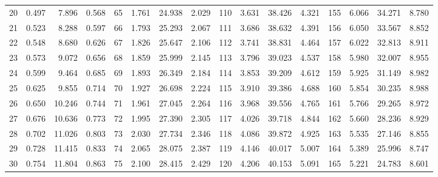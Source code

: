 \begin{table}
{\begin{tabular}{rrrr|rrrr|rrrr|rrrr}
 20 & \tiny{  0.497} &   7.896 & \tiny{  0.568} &  65 & \tiny{  1.761} &  24.938 & \tiny{  2.029} & 110 & \tiny{  3.631} &  38.426 & \tiny{  4.321} & 155 & \tiny{  6.066} &  34.271 & \tiny{  8.780}\\
 21 & \tiny{  0.523} &   8.288 & \tiny{  0.597} &  66 & \tiny{  1.793} &  25.293 & \tiny{  2.067} & 111 & \tiny{  3.686} &  38.632 & \tiny{  4.391} & 156 & \tiny{  6.050} &  33.567 & \tiny{  8.852}\\
 22 & \tiny{  0.548} &   8.680 & \tiny{  0.626} &  67 & \tiny{  1.826} &  25.647 & \tiny{  2.106} & 112 & \tiny{  3.741} &  38.831 & \tiny{  4.464} & 157 & \tiny{  6.022} &  32.813 & \tiny{  8.911}\\
 23 & \tiny{  0.573} &   9.072 & \tiny{  0.656} &  68 & \tiny{  1.859} &  25.999 & \tiny{  2.145} & 113 & \tiny{  3.796} &  39.023 & \tiny{  4.537} & 158 & \tiny{  5.980} &  32.007 & \tiny{  8.955}\\
 24 & \tiny{  0.599} &   9.464 & \tiny{  0.685} &  69 & \tiny{  1.893} &  26.349 & \tiny{  2.184} & 114 & \tiny{  3.853} &  39.209 & \tiny{  4.612} & 159 & \tiny{  5.925} &  31.149 & \tiny{  8.982}\\
 25 & \tiny{  0.625} &   9.855 & \tiny{  0.714} &  70 & \tiny{  1.927} &  26.698 & \tiny{  2.224} & 115 & \tiny{  3.910} &  39.386 & \tiny{  4.688} & 160 & \tiny{  5.854} &  30.235 & \tiny{  8.988}\\
 26 & \tiny{  0.650} &  10.246 & \tiny{  0.744} &  71 & \tiny{  1.961} &  27.045 & \tiny{  2.264} & 116 & \tiny{  3.968} &  39.556 & \tiny{  4.765} & 161 & \tiny{  5.766} &  29.265 & \tiny{  8.972}\\
 27 & \tiny{  0.676} &  10.636 & \tiny{  0.773} &  72 & \tiny{  1.995} &  27.390 & \tiny{  2.305} & 117 & \tiny{  4.026} &  39.718 & \tiny{  4.844} & 162 & \tiny{  5.660} &  28.236 & \tiny{  8.929}\\
 28 & \tiny{  0.702} &  11.026 & \tiny{  0.803} &  73 & \tiny{  2.030} &  27.734 & \tiny{  2.346} & 118 & \tiny{  4.086} &  39.872 & \tiny{  4.925} & 163 & \tiny{  5.535} &  27.146 & \tiny{  8.855}\\
 29 & \tiny{  0.728} &  11.415 & \tiny{  0.833} &  74 & \tiny{  2.065} &  28.075 & \tiny{  2.387} & 119 & \tiny{  4.146} &  40.017 & \tiny{  5.007} & 164 & \tiny{  5.389} &  25.996 & \tiny{  8.747}\\
 30 & \tiny{  0.754} &  11.804 & \tiny{  0.863} &  75 & \tiny{  2.100} &  28.415 & \tiny{  2.429} & 120 & \tiny{  4.206} &  40.153 & \tiny{  5.091} & 165 & \tiny{  5.221} &  24.783 & \tiny{  8.601}\\

\end{tabular}}
\end{table}
